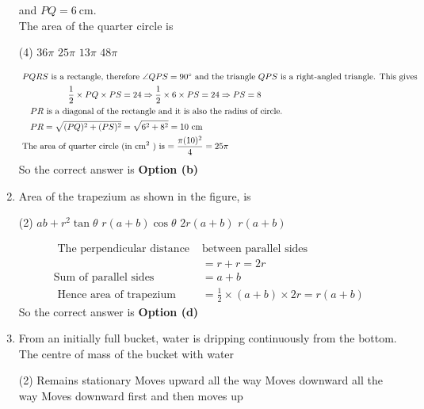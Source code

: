 \begin{enumerate}
and $P Q=6 \mathrm{~cm}$.	\\
The area of the quarter circle is
	 \begin{tasks}(4)
		\task[\textbf{a.}]$36 \pi$
		\task[\textbf{b.}]$25 \pi$
		\task[\textbf{c.}] $13 \pi$
		\task[\textbf{d.}] $48 \pi$
	\end{tasks}
\begin{answer}
	\begin{align*}
\intertext{ $P Q R S$ is a rectangle, therefore $\angle Q P S=90^{\circ}$ and the triangle $Q P S$ is a right-angled triangle. This gives}
 \frac{1}{2} \times P Q \times P S&=24 \Rightarrow \frac{1}{2} \times 6 \times P S=24 \Rightarrow P S=8\\
	\text{$P R$ is a diagonal of the }&\text{rectangle and it is also the radius of circle.}\\
	P R=\sqrt{(P Q)^{2}+(P S)^{2}}&=\sqrt{6^{2}+8^{2}}=10 \mathrm{~cm}\\
\text{	The area of quarter circle }&\text{(in $\mathrm{cm}^{2}$ ) is $=\frac{\pi(10)^{2}}{4}=25 \pi$}
	\end{align*}
		So the correct answer is \textbf{Option (b)}
\end{answer}
\item Area of the trapezium as shown in the figure, is	\\
 \begin{tasks}(2)
	\task[\textbf{a.}]$a b+r^{2} \tan \theta$
	\task[\textbf{b.}]$r(a+b) \cos \theta$
	\task[\textbf{c.}]$2 r(a+b)$
	\task[\textbf{d.}] $r(a+b)$
\end{tasks}
\begin{answer}
	\begin{align*}
\text{ The perpendicular distance }&\text{between parallel sides }\\
&=r+r=2 r\\
	\text{Sum of parallel sides }&=a+b\\
\text{	Hence area of trapezium }&=\frac{1}{2} \times(a+b) \times 2 r=r(a+b)
	\end{align*}
		So the correct answer is \textbf{Option (d)}
\end{answer}
\item From an initially full bucket, water is dripping continuously from the bottom. The centre of mass of the bucket with water
 \begin{tasks}(2)
	\task[\textbf{a.}]Remains stationary
	\task[\textbf{b.}]Moves upward all the way
	\task[\textbf{c.}]Moves downward all the way
	\task[\textbf{d.}]Moves downward first and then moves up

\end{tasks}
\end{enumerate}
